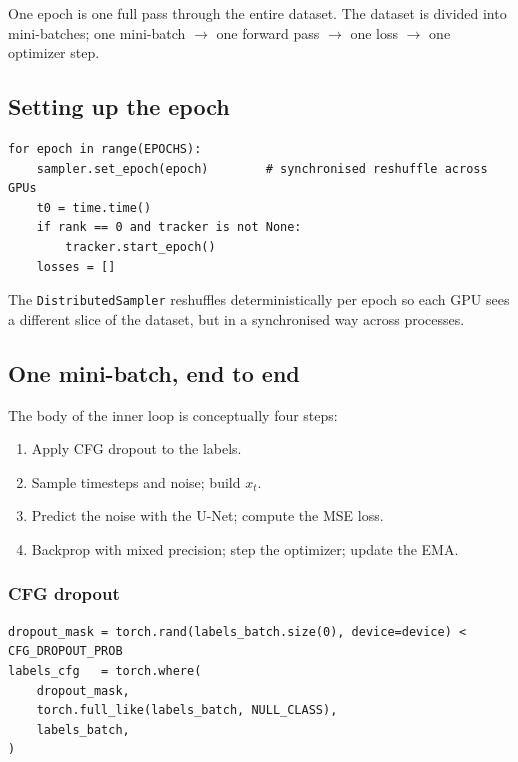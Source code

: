 \documentclass[11pt]{article}
\newcommand{\code}[1]{\texttt{#1}}
\newcommand{\xT}{x_t}
\begin{document}
One epoch is one full pass through the entire dataset. The dataset is divided
into mini-batches; one mini-batch $\to$ one forward pass $\to$ one loss $\to$
one optimizer step.

\subsection{Setting up the epoch}

\begin{lstlisting}
for epoch in range(EPOCHS):
    sampler.set_epoch(epoch)        # synchronised reshuffle across GPUs
    t0 = time.time()
    if rank == 0 and tracker is not None:
        tracker.start_epoch()
    losses = []
\end{lstlisting}

The \code{DistributedSampler} reshuffles deterministically per epoch so each
GPU sees a different slice of the dataset, but in a synchronised way across
processes.

\subsection{One mini-batch, end to end}

The body of the inner loop is conceptually four steps:
\begin{enumerate}[leftmargin=*]
  \item Apply CFG dropout to the labels.
  \item Sample timesteps and noise; build $\xT$.
  \item Predict the noise with the U-Net; compute the MSE loss.
  \item Backprop with mixed precision; step the optimizer; update the EMA.
\end{enumerate}

\subsubsection{CFG dropout}

\begin{lstlisting}
dropout_mask = torch.rand(labels_batch.size(0), device=device) < CFG_DROPOUT_PROB
labels_cfg   = torch.where(
    dropout_mask,
    torch.full_like(labels_batch, NULL_CLASS),
    labels_batch,
)
\end{lstlisting}
\end{document}
